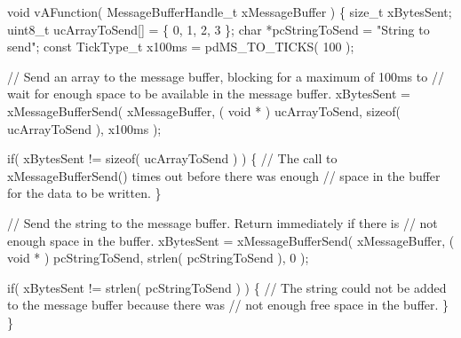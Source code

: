 \begin{DoxyPre}
\begin{DoxyPre}
\begin{DoxyPre}
void vAFunction( MessageBufferHandle\_t xMessageBuffer )
\{
size\_t xBytesSent;
uint8\_t ucArrayToSend[] = \{ 0, 1, 2, 3 \};
char *pcStringToSend = "String to send";
const TickType\_t x100ms = pdMS\_TO\_TICKS( 100 );\end{DoxyPre}
\end{DoxyPre}
\end{DoxyPre}



\begin{DoxyPre}
\begin{DoxyPre}
\begin{DoxyPre}    // Send an array to the message buffer, blocking for a maximum of 100ms to
    // wait for enough space to be available in the message buffer.
    xBytesSent = xMessageBufferSend( xMessageBuffer, ( void * ) ucArrayToSend, sizeof( ucArrayToSend ), x100ms );\end{DoxyPre}
\end{DoxyPre}
\end{DoxyPre}



\begin{DoxyPre}
\begin{DoxyPre}
\begin{DoxyPre}    if( xBytesSent != sizeof( ucArrayToSend ) )
    \{
        // The call to xMessageBufferSend() times out before there was enough
        // space in the buffer for the data to be written.
    \}\end{DoxyPre}
\end{DoxyPre}
\end{DoxyPre}



\begin{DoxyPre}
\begin{DoxyPre}
\begin{DoxyPre}    // Send the string to the message buffer.  Return immediately if there is
    // not enough space in the buffer.
    xBytesSent = xMessageBufferSend( xMessageBuffer, ( void * ) pcStringToSend, strlen( pcStringToSend ), 0 );\end{DoxyPre}
\end{DoxyPre}
\end{DoxyPre}



\begin{DoxyPre}
\begin{DoxyPre}
\begin{DoxyPre}    if( xBytesSent != strlen( pcStringToSend ) )
    \{
        // The string could not be added to the message buffer because there was
        // not enough free space in the buffer.
    \}
\}
\end{DoxyPre}
 \end{DoxyPre}
\end{DoxyPre}
